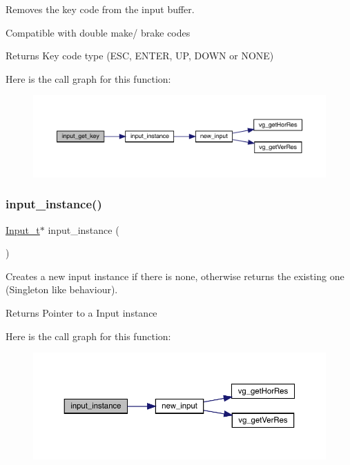 Remove\textquotesingle{}s the key code from the input buffer. 

Compatible with double make/ brake codes

\begin{DoxyReturn}{Returns}
Key code type (E\+SC, E\+N\+T\+ER, UP, D\+O\+WN or N\+O\+NE) 
\end{DoxyReturn}
Here is the call graph for this function\+:
\nopagebreak
\begin{figure}[H]
\begin{center}
\leavevmode
\includegraphics[width=350pt]{group___input_ga4abaa84a7ae0505c6acab391f82ab1ac_cgraph}
\end{center}
\end{figure}
\hypertarget{group___input_ga8221771f8f04f39255e0b9f577c080e9}{}\label{group___input_ga8221771f8f04f39255e0b9f577c080e9} 
\subsubsection{\texorpdfstring{input\+\_\+instance()}{input\_instance()}}
{\footnotesize\ttfamily \hyperlink{struct_input__t}{Input\+\_\+t}$\ast$ input\+\_\+instance (\begin{DoxyParamCaption}{ }\end{DoxyParamCaption})}



Creates a new input instance if there is none, otherwise returns the existing one (Singleton like behaviour). 

\begin{DoxyReturn}{Returns}
Pointer to a Input instance 
\end{DoxyReturn}
Here is the call graph for this function\+:
\nopagebreak
\begin{figure}[H]
\begin{center}
\leavevmode
\includegraphics[width=350pt]{group___input_ga8221771f8f04f39255e0b9f577c080e9_cgraph}
\end{center}
\end{figure}
\hypertarget{group___input_ga2f4098fc71cbd39422c1001d66970bf5}{}\label{group___input_ga2f4098fc71cbd39422c1001d66970bf5} 
